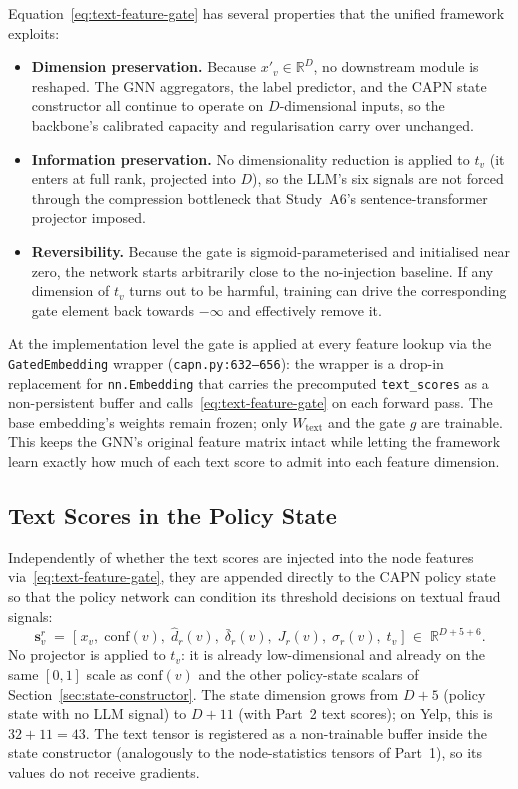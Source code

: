 Equation~\eqref{eq:text-feature-gate} has several properties that the unified framework exploits:

\begin{itemize}
    \item \textbf{Dimension preservation.} Because $x'_v \in \mathbb{R}^{D}$, no downstream module is reshaped. The GNN aggregators, the label predictor, and the CAPN state constructor all continue to operate on $D$-dimensional inputs, so the backbone's calibrated capacity and regularisation carry over unchanged.
    \item \textbf{Information preservation.} No dimensionality reduction is applied to $t_v$ (it enters at full rank, projected into $D$), so the LLM's six signals are not forced through the compression bottleneck that Study~A6's sentence-transformer projector imposed.
    \item \textbf{Reversibility.} Because the gate is sigmoid-parameterised and initialised near zero, the network starts arbitrarily close to the no-injection baseline. If any dimension of $t_v$ turns out to be harmful, training can drive the corresponding gate element back towards $-\infty$ and effectively remove it.
\end{itemize}

At the implementation level the gate is applied at every feature lookup via the \texttt{GatedEmbedding} wrapper (\texttt{capn.py:632--656}): the wrapper is a drop-in replacement for \texttt{nn.Embedding} that carries the precomputed \texttt{text\_scores} as a non-persistent buffer and calls~\eqref{eq:text-feature-gate} on each forward pass. The base embedding's weights remain frozen; only $W_{\text{text}}$ and the gate $g$ are trainable. This keeps the GNN's original feature matrix intact while letting the framework learn exactly how much of each text score to admit into each feature dimension.

\subsection{Text Scores in the Policy State}
\label{sec:text-state-enrichment}

Independently of whether the text scores are injected into the node features via~\eqref{eq:text-feature-gate}, they are appended directly to the CAPN policy state so that the policy network can condition its threshold decisions on textual fraud signals:
\begin{equation}
    \mathbf{s}_v^{r} \;=\; \bigl[\; x_v,\; \mathrm{conf}(v),\; \hat{d}_r(v),\; \bar{\delta}_r(v),\; J_r(v),\; \sigma_r(v),\; t_v \;\bigr]
    \;\in\; \mathbb{R}^{D + 5 + 6}.
    \label{eq:state-with-text}
\end{equation}
No projector is applied to $t_v$: it is already low-dimensional and already on the same $[0, 1]$ scale as $\mathrm{conf}(v)$ and the other policy-state scalars of Section~\ref{sec:state-constructor}. The state dimension grows from $D + 5$ (policy state with no LLM signal) to $D + 11$ (with Part~2 text scores); on Yelp, this is $32 + 11 = 43$. The text tensor is registered as a non-trainable buffer inside the state constructor (analogously to the node-statistics tensors of Part~1), so its values do not receive gradients.

